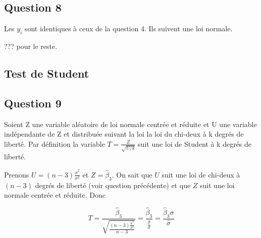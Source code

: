 \documentclass[]{book}
\theoremstyle{definition}
\begin{document}
\subsection*{Question 8}
Les $y_i$ sont identiques \`a ceux de la question 4. Ils suivent une loi normale.

??? pour le reste.

\subsection*{Test de Student}
\subsection*{Question 9}
Soient Z une variable al\'eatoire de loi normale centr\'ee et r\'eduite et U une variable ind\'ependante de Z et distribu\'ee suivant la loi la loi du chi-deux \`a k degr\'es de libert\'e. Par d\'efinition la variable $T=\frac {Z}{\sqrt {U/k}}$ suit une loi de Student \`a k degr\'es de libert\'e.

Prenons $U = (n-3)\frac{\hat{\sigma}^2}{\sigma^2}$ et $Z = \hat{\beta}_3$. On sait que $U$ suit une loi de chi-deux \`a $(n-3)$ degr\'es de libert\'e (voir question pr\'ec\'edente) et que $Z$ suit une loi normale centr\'ee et r\'eduite. Donc

$$
T = \frac{\hat{\beta}_3}{\sqrt{\frac{(n-3)\frac{\hat{\sigma}^2}{\sigma^2}}{n-3}}} = \frac{\hat{\beta}_3}{\frac{\hat{\sigma}}{\sigma}} = \frac{\hat{\beta}_3\sigma}{\hat{\sigma}}
$$
\end{document}
